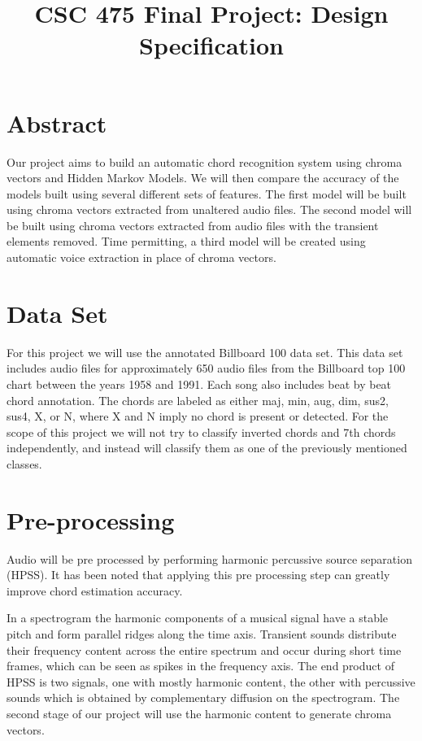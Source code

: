 \documentclass{article}
\title{CSC 475 Final Project: Design Specification}
\begin{document}
%
\maketitle
%

\section{Abstract}\label{sec:desoutline}
Our project aims to build an automatic chord recognition system using chroma
vectors and Hidden Markov Models. We will then compare the accuracy
of the models built using several different sets of features. The first model
will be built using chroma vectors extracted from unaltered audio files. The
second model will be built using chroma vectors extracted from audio files with
the transient elements removed. Time permitting, a third model will be created
using automatic voice extraction in place of chroma vectors.

\section{Data Set}

For this project we will use the annotated Billboard 100 data set. This data
set includes audio files for approximately 650 audio files from the Billboard
top 100 chart between the years 1958 and 1991. Each song also includes beat by
beat chord annotation\cite{Burgoyne:07}. The chords are labeled as either maj,
min, aug, dim, sus2, sus4, X, or N, where X and N imply no chord is present or detected.
For the scope of this project we will not try to classify inverted chords and
7th chords independently, and instead will classify them as one of the previously mentioned
classes.

\section{Pre-processing}
Audio will be pre processed by performing harmonic percussive source separation
(HPSS). It has been noted that applying this pre processing step can greatly
improve chord estimation accuracy\cite{Reed:09}.

In a spectrogram the harmonic components of a musical signal have a
stable pitch and form parallel ridges along the time axis. Transient sounds
distribute their frequency content across the entire spectrum and occur during
short time frames, which can be seen as spikes in the frequency axis. The end
product of HPSS is two signals, one with mostly harmonic content, the other
with percussive sounds which is obtained by complementary diffusion on the
spectrogram. The second stage of our project will use the harmonic content to
generate chroma vectors.
\end{document}
